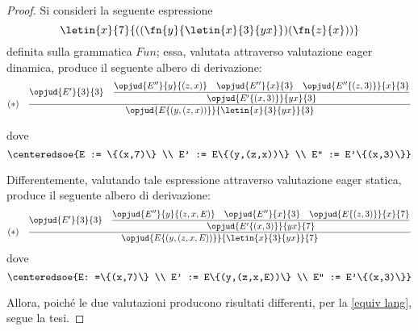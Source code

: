 \documentclass[a4paper, 12pt]{report}
\begin{document}
    \begin{proof}
        Si consideri la seguente espressione $$\letin{x}{7}{((\fn{y}{\letin{x}{3}{yx}})(\fn{z}{x}))}$$ definita sulla grammatica $Fun$; essa, valutata attraverso valutazione eager dinamica, produce il seguente albero di derivazione: $$(*) \quad \dfrac{\opjud{E'}{3}{3} \quad \dfrac{\opjud{E''}{y}{(z,x)} \quad \opjud{E''}{x}{3} \quad \opjud{E''\{(z,3)\}}{x}{3}}{\opjud{E'\{(x,3)\}}{yx}{3}}}{\opjud{E\{(y,(z,x))\}}{\letin{x}{3}{yx}}{3}}$$ 

        dove $$\centeredsoe{E := \{(x,7)\} \\ E' := E\{(y,(z,x))\} \\ E'' := E'\{(x,3)\}}$$

        Differentemente, valutando tale espressione attraverso valutazione eager statica, produce il seguente albero di derivazione: $$(*) \quad \dfrac{\opjud{E'}{3}{3} \quad \dfrac{\opjud{E''}{y}{(z,x,E)} \quad \opjud{E''}{x}{3} \quad \opjud{E\{(z,3)\}}{x}{7}}{\opjud{E'\{(x,3)\}}{yx}{7}}}{\opjud{E\{(y,(z,x,E))\}}{\letin{x}{3}{yx}}{7}}$$  dove $$\centeredsoe{E: =\{(x,7)\} \\ E' := E\{(y,(z,x,E))\} \\ E'' := E'\{(x,3)\}}$$

        Allora, poiché le due valutazioni producono risultati differenti, per la \cref{equiv lang}, segue la tesi.
    \end{proof}
\end{document}
